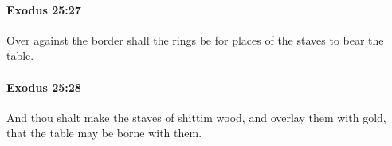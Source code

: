 		\paragraph{Exodus 25:27} %
			\label{EXODUS-25-27}

			Over against the border shall the rings be for places of the staves to bear the table.


		\paragraph{Exodus 25:28} %
			\label{EXODUS-25-28}

			And thou shalt make the staves of shittim wood, and overlay them with gold, that the table may be borne with them.


